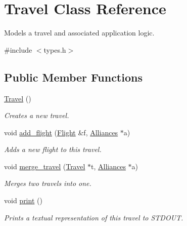 \hypertarget{class_travel}{\section{Travel Class Reference}
\label{class_travel}
}


Models a travel and associated application logic.  




{\ttfamily \#include $<$types.\-h$>$}

\subsection*{Public Member Functions}
\begin{DoxyCompactItemize}
\item 
\hyperlink{class_travel_acc3bc73b916e588699d18ba7d4bb25c2}{Travel} ()
\begin{DoxyCompactList}\small\item\em Creates a new travel. \end{DoxyCompactList}\item 
void \hyperlink{class_travel_a3931da21a87c37cc604e3700c8557d1f}{add\-\_\-flight} (\hyperlink{struct_flight}{Flight} \&f, \hyperlink{types_8h_a942cbcc40778424afe78605ae5c364c0}{Alliances} $\ast$a)
\begin{DoxyCompactList}\small\item\em Adds a new flight to this travel. \end{DoxyCompactList}\item 
void \hyperlink{class_travel_a4240b6040357dc4b02c4be93a246c785}{merge\-\_\-travel} (\hyperlink{class_travel}{Travel} $\ast$t, \hyperlink{types_8h_a942cbcc40778424afe78605ae5c364c0}{Alliances} $\ast$a)
\begin{DoxyCompactList}\small\item\em Merges two travels into one. \end{DoxyCompactList}\item 
void \hyperlink{class_travel_a011123097200d9468d1fe08b300052f8}{print} ()
\begin{DoxyCompactList}\small\item\em Prints a textual representation of this travel to S\-T\-D\-O\-U\-T. \end{DoxyCompactList}\end{DoxyCompactItemize}
